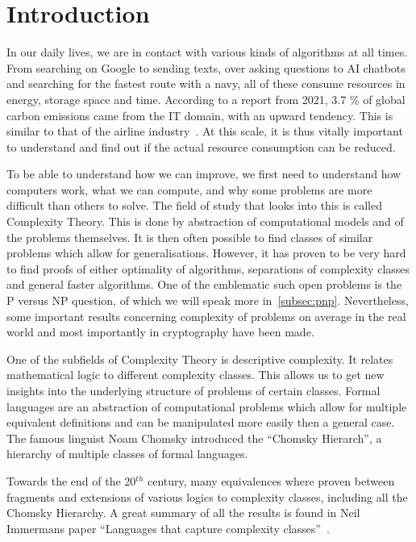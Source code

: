 \chapter{Introduction}\label{ch:intro}

In our daily lives, we are in contact with various kinds of algorithms at all times.
From searching on Google to sending texts, over asking questions to AI chatbots and searching for the fastest route with a navy, all of these consume resources in energy, storage space and time.
According to a report from 2021, 3.7 \% of global carbon emissions came from the IT domain, with an upward tendency.
This is similar to that of the airline industry~\cite{webFootprint}.
At this scale, it is thus vitally important to understand and find out if the actual resource consumption can be reduced.

To be able to understand how we can improve, we first need to understand how computers work, what we can compute, and why some problems are more difficult than others to solve.
The field of study that looks into this is called Complexity Theory.
This is done by abstraction of computational models and of the problems themselves.
It is then often possible to find classes of similar problems which allow for generalisations.
However, it has proven to be very hard to find proofs of either optimality of algorithms, separations of complexity classes and general faster algorithms.
One of the emblematic such open problems is the P versus NP question, of which we will speak more in~\cref{subsec:pnp}.
Nevertheless, some important results concerning complexity of problems on average in the real world and most importantly in cryptography have been made.

One of the subfields of Complexity Theory is descriptive complexity.
It relates mathematical logic to different complexity classes.
This allows us to get new insights into the underlying structure of problems of certain classes.
Formal languages are an abstraction of computational problems which allow for multiple equivalent definitions and can be manipulated more easily then a general case.
The famous linguist Noam Chomsky introduced the ``Chomsky Hierarch'', a hierarchy of multiple classes of formal languages.

Towards the end of the 20$^{th}$ century, many equivalences where proven between fragments and extensions of various logics to complexity classes, including all the Chomsky Hierarchy.
A great summary of all the results is found in Neil Immermans paper ``Languages that capture complexity classes''~\cite{Immerman1987}.

